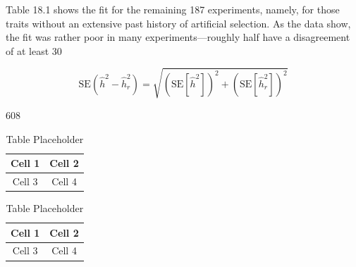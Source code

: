 \documentclass{article}
\begin{document}
Table 18.1 shows the fit for the remaining 187 experiments, namely, for those traits without an extensive past history of artificial selection. As the data show, the fit was rather poor in many experiments—roughly half have a disagreement of at least 30%

\begin{equation}
\mathrm{SE}\left(\widehat{h}^{2}-\widehat{h}_{r}^{2}\right)=\sqrt{\left(\mathrm{SE}[\widehat{h}^{2}]\right)^{2}+\left(\mathrm{SE}[\widehat{h}_{r}^{2}]\right)^{2}}
\tag{18.22}
\label{eq:18_22}
\end{equation}

608

\begin{table}[h]
\centering
\begin{tabular}{|c|c|}
\hline
Cell 1 & Cell 2 \\
\hline
Cell 3 & Cell 4 \\
\hline
\end{tabular}
\caption{Table Placeholder}
\end{table}

\begin{table}[h]
\centering
\begin{tabular}{|c|c|}
\hline
Cell 1 & Cell 2 \\
\hline
Cell 3 & Cell 4 \\
\hline
\end{tabular}
\caption{Table Placeholder}
\end{table}
\end{document}
